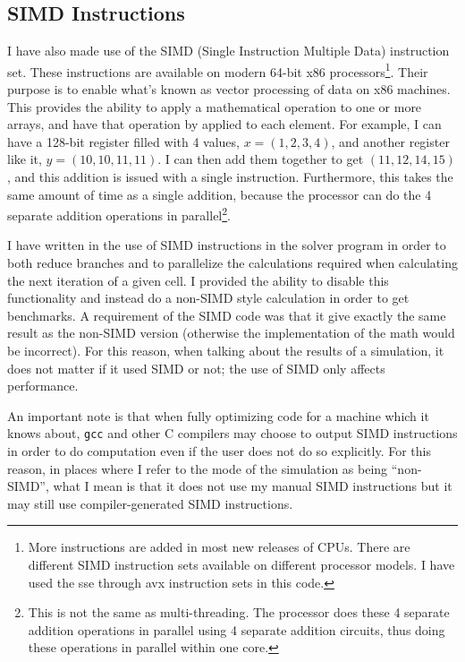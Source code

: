 \subsection{SIMD Instructions}
I have also made use of the SIMD (Single Instruction Multiple Data) instruction set. These instructions are available
on modern 64-bit x86 processors\cite{intel-3a}\footnote{More instructions are added in most new releases of CPUs. There are different
SIMD instruction sets available on different processor models. I have used the sse through avx instruction sets in this
code.}. Their purpose is to enable what's known as vector processing of data on x86 machines. This provides the ability
to apply a mathematical operation to one or more arrays, and have that operation by applied to each element. For example,
I can have a 128-bit register filled with 4 values, $x=(1,2,3,4)$, and another register like it, $y=(10, 10, 11, 11)$. I can
then add them together to get $(11, 12, 14, 15)$, and this addition is issued with a single instruction. Furthermore, this
takes the same amount of time as a single addition, because the processor can do the 4 separate addition operations in
parallel\footnote{This is not the same as multi-threading. The processor does these 4 separate addition operations in parallel
using 4 separate addition circuits, thus doing these operations in parallel within one core.}.

I have written in the use of SIMD instructions in the solver program in order to both reduce branches and to parallelize
the calculations required when calculating the next iteration of a given cell. I provided the ability to disable this
functionality and instead do a non-SIMD style calculation in order to get benchmarks. A requirement of the SIMD code was
that it give exactly the same result as the non-SIMD version (otherwise the implementation of the math would be incorrect).
For this reason, when talking about the results of a simulation, it does not matter if it used SIMD or not; the use
of SIMD only affects performance.

An important note is that when fully optimizing code for a machine which it knows about, \texttt{gcc} and other C compilers may choose to output
SIMD instructions in order to do computation even if the user does not do so explicitly. For this reason, in places where
I refer to the mode of the simulation as being ``non-SIMD'', what I mean is that it does not use my manual SIMD instructions
but it may still use compiler-generated SIMD instructions.

















